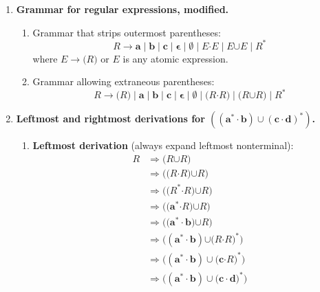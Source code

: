 \begin{enumerate}[{9.}1. ]
\item \textbf{Grammar for regular expressions, modified.}

\begin{enumerate}
\item Grammar that strips outermost parentheses:
\[
R \to \pmb{a}\mid\pmb{b}\mid\pmb{c}\mid\pmb{\epsilon}\mid\pmb{\emptyset}\mid E\pmb{\cdot}E\mid E\pmb{\cup}E\mid R^{\pmb{*}}
\]
where $E \to \pmb{(}R\pmb{)}$ or $E$ is any atomic expression.

\item Grammar allowing extraneous parentheses:
\[
R \to \pmb{(}R\pmb{)} \mid \pmb{a}\mid\pmb{b}\mid\pmb{c}\mid\pmb{\epsilon}\mid\pmb{\emptyset}\mid\pmb{(}R\pmb{\cdot}R\pmb{)}\mid\pmb{(}R\pmb{\cup}R\pmb{)}\mid R^{\pmb{*}}
\]
\end{enumerate}

\item \textbf{Leftmost and rightmost derivations for $\pmb{((a^*\cdot b)\cup(c\cdot d)^*)}$.}

\begin{enumerate}
\item \textbf{Leftmost derivation} (always expand leftmost nonterminal):
\begin{align*}
R &\Rightarrow \pmb{(}R\pmb{\cup}R\pmb{)} \\
&\Rightarrow \pmb{(}\pmb{(}R\pmb{\cdot}R\pmb{)}\pmb{\cup}R\pmb{)} \\
&\Rightarrow \pmb{((}R^{\pmb{*}}\pmb{\cdot}R\pmb{)}\pmb{\cup}R\pmb{)} \\
&\Rightarrow \pmb{((}\pmb{a}^{\pmb{*}}\pmb{\cdot}R\pmb{)}\pmb{\cup}R\pmb{)} \\
&\Rightarrow \pmb{((a^*\cdot}\pmb{b}\pmb{)}\pmb{\cup}R\pmb{)} \\
&\Rightarrow \pmb{((a^*\cdot b)}\pmb{\cup}\pmb{(}R\pmb{\cdot}R\pmb{)}^{\pmb{*}}\pmb{)} \\
&\Rightarrow \pmb{((a^*\cdot b)\cup(}\pmb{c}\pmb{\cdot}R\pmb{)}^{\pmb{*}}\pmb{)} \\
&\Rightarrow \pmb{((a^*\cdot b)\cup(c\cdot}\pmb{d}\pmb{)}^{\pmb{*}}\pmb{)}
\end{align*}


\end{enumerate}
\end{enumerate}
